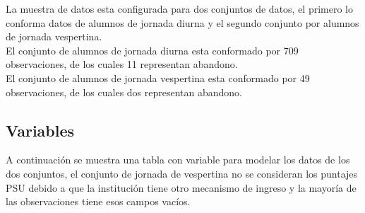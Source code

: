 La muestra de datos esta configurada para dos conjuntos de datos, el primero lo conforma datos de alumnos de jornada diurna y el segundo conjunto por alumnos de jornada vespertina.\\

El conjunto de alumnos de jornada diurna esta conformado por 709 observaciones, de los cuales 11 representan abandono.\\

El conjunto de alumnos de jornada vespertina esta conformado por 49 observaciones, de los cuales dos representan abandono.\\

\subsection{Variables}

A continuación se muestra una tabla con variable para modelar los datos de los dos conjuntos, el conjunto de jornada de vespertina no se consideran los puntajes PSU debido a que la institución tiene otro mecanismo de ingreso y la mayoría de las observaciones tiene esos campos vacíos.\\

